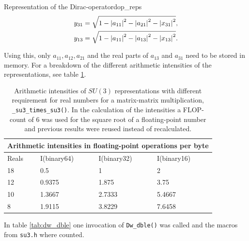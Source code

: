 \documentclass{article}
\theoremstyle{plain} %
\theoremstyle{convention} %
\theoremstyle{remark} %
\def\code#1{\texttt{#1}}
\numberwithin{equation}{section}
\begin{document}
\begin{proposal}{Representation of the Dirac-operator}{dop_reps}
\begin{align}
  y_{31} &= \sqrt{1 - \abs{a_{11}}^2 - \abs{a_{21}}^2 - \abs{x_{31}}^2}, \\
  y_{13} &= \sqrt{1 - \abs{a_{11}}^2 - \abs{a_{13}}^2 - \abs{x_{13}}^2}.
\end{align}

Using this, only $a_{11}, a_{12}, a_{21}$ and the real parts of $a_{13}$ and $a_{31}$ need to be stored in memory. For a breakdown of the different arithmetic intensities of the representations, see table \ref{tab:ai_su3}.

\begin{table}[H]
\centering
    \begin{tabular}{ |p{1.2cm}|p{2cm}|p{2cm}|p{2cm}|  }
        \hline
        \multicolumn{4}{|c|}{Arithmetic intensities in floating-point operations per byte} \\
        \hline
        Reals & I(binary64) & I(binary32) & I(binary16) \\
        \hline
        18  & 0.5    & 1       & 2      \\
        12  & 0.9375 & 1.875   & 3.75   \\
        10  & 1.3667 & 2.7333  & 5.4667 \\
        8   & 1.9115 & 3.8229  & 7.6458 \\
        \hline
    \end{tabular}
    \caption{Arithmetic intensities of $SU(3)$ representations with different requirement for real numbers for a matrix-matrix multiplication, \code{\_su3\_times\_su3()}. In the calculation of the intensities a FLOP-count of \num{6} was used for the square root of a floating-point number and previous results were reused instead of recalculated.}
    \label{tab:ai_su3}
\end{table}
    
In table \ref{tab:dw_dble} one invocation of \code{Dw\_dble()} was called and the macros from \code{su3.h} where counted.


\end{proposal}
\end{document}
